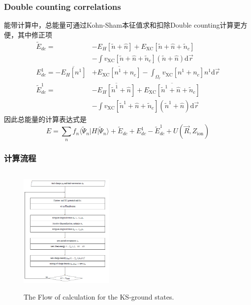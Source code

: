 \documentclass[cjk,slidestop,compress,mathserif,blue]{beamer}
\begin{document}
\frame
{
	\frametitle{\textrm{Double counting correlations}}
	能带计算中，总能量可通过\textrm{Kohn-Sham}本征值求和扣除\textrm{Double counting}计算更方便，其中修正项
	\begin{displaymath}
		\begin{aligned}
			\tilde E_{dc}=&-E_H[\tilde n+\hat n]+E_{\mathrm{XC}}[\tilde n+\hat n+\tilde n_c]\\
			&-\int v_{\mathrm{XC}}[\tilde n+\hat n+\tilde n_c](\tilde n+\hat n)\mathrm{d}\vec r\\
			E_{dc}^1=-\overline{E_H[n^1]}&+\overline{E_{\mathrm{XC}}[n^1+n_c]}-\int_{\Omega_r}v_{\mathrm{XC}}[n^1+n_c]n^1\mathrm{d}\vec r\\
			\tilde E_{dc}^1=&-\overline{E_H[\tilde n^1+\hat n]}+\overline{E_{\mathrm{XC}}[\tilde n^1+\hat n+\tilde n_c]}\\
			&-\int v_{\mathrm{XC}}[\tilde n^1+\hat n+\tilde n_c](\tilde n^1+\hat n)\mathrm{d}\vec r
		\end{aligned}
	\end{displaymath}
	因此总能量的计算表达式是
	$$E=\sum_nf_n\langle\tilde\Psi_n|H|\tilde\Psi_n\rangle+\tilde E_{dc}+E_{dc}^1-\tilde E_{dc}^1+U(\vec R,Z_{\mathrm{ion}})$$
}

\frame
{
	\frametitle{计算流程}
\begin{figure}[h!]
	\vspace{-0.2in}
\centering
\includegraphics[height=2.5in,width=1.8in,viewport=0 0 480 630,clip]{Figures/VASP_procedure.png}
\caption{\tiny \textrm{The Flow of calculation for the KS-ground states.}}%
\label{PAW_baiseset}
\end{figure} 
}
\end{document}
